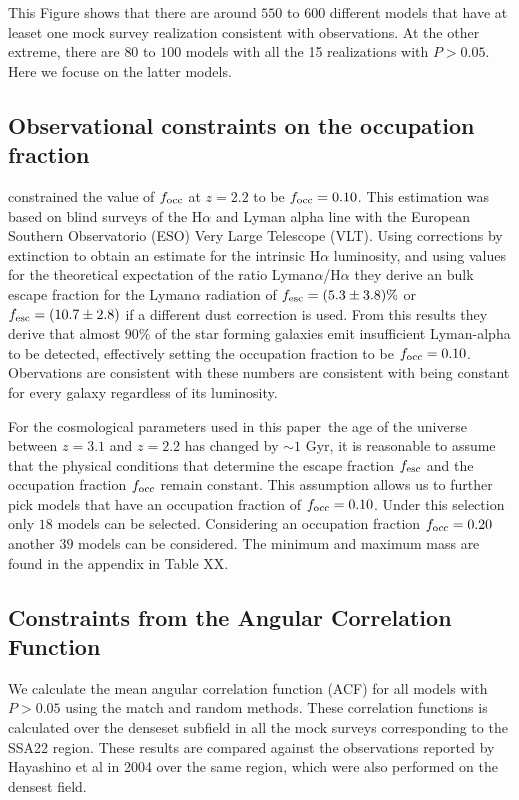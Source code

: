 \documentclass[usenatbib]{mn2e}
\newcommand{\documentname}{paper~}
\begin{document}
This Figure shows that there are around $550$ to $600$ different
models that have at leaset one mock survey realization consistent with
observations. At the other extreme, there are $80$ to $100$ models
with all the 15 realizations with $P>0.05$. Here we focuse on the
latter models. 


\subsection{Observational constraints on the occupation fraction}

\cite{Hayes2010} constrained the value of $f_{\rm occ}$ at $z=2.2$ to
be $f_{\rm occ}=0.10$. This estimation was based on blind surveys of
the H$\alpha$ and Lyman alpha line with the European Southern
Observatorio (ESO) Very Large Telescope (VLT). Using corrections by
extinction to obtain an estimate for the intrinsic H$\alpha$
luminosity, and using values for the theoretical expectation of the
ratio Lyman$\alpha$/H$\alpha$ they derive an bulk escape fraction for
the Lyman$\alpha$ radiation of $f_{\rm esc}=(5.3\pm 3.8)\%$ or $f_{\rm
esc}=(10.7\pm 2.8)$ if a different dust correction is used. From this
results they derive that almost $90\%$ of the star forming galaxies
emit insufficient Lyman-alpha to be detected, effectively setting the
occupation fraction to be $f_{\rm occ}=0.10$. Obervations are
consistent with these numbers are
consistent with being constant for every galaxy regardless of its
luminosity. 

For the cosmological parameters used in this \documentname the age of
the universe between $z=3.1$ and $z=2.2$ has changed by $\sim 1$ Gyr,
it is reasonable to assume that the physical conditions that determine
the escape fraction $f_{\rm esc}$ and the occupation fraction $f_{\rm
  occ}$ remain constant. This assumption allows us to further pick
models that have an occupation fraction of $f_{\rm occ}=0.10$. Under
this selection only $18$ models can be selected. Considering an
occupation fraction $f_{\rm occ}=0.20$ another $39$ models can be
considered. The minimum and maximum mass are found in the appendix in
Table XX. 

\subsection{Constraints from the Angular Correlation Function}

We calculate the mean angular correlation function (ACF) for all
models with $P>0.05$ using the match and random methods. These
correlation functions is calculated over the denseset subfield in all the
mock surveys corresponding to the SSA22 region. These results are
compared against the observations reported by Hayashino et al in 2004
over the same region, which were also performed on the densest field. 
\end{document}
